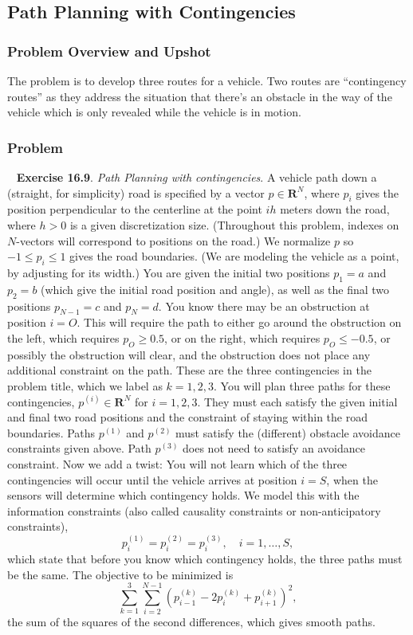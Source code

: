 \documentclass[12pt,reqno]{article}
\theoremstyle{definition}
\numberwithin{equation}{section}
\begin{document}
\newpage
\subsection{Path Planning with Contingencies}

\subsubsection*{Problem Overview and Upshot}

The problem is to develop three routes for a vehicle. Two routes are ``contingency routes''
as they address the situation that there's an obstacle in the way of the vehicle which is only
revealed while the vehicle is in motion.

\subsubsection*{Problem}
~\cite{EE364a-extra} \textbf{Exercise 16.9}. \textit{Path Planning with contingencies}.
A vehicle path down a (straight, for simplicity) road is specified
by a vector $p \in \mathbf{R}^N$, where $p_i$ gives the position perpendicular to the centerline at the point $i h$ meters down the road, where $h>0$ is a given discretization size. (Throughout this problem, indexes on $N$-vectors will correspond to positions on the road.)
We normalize $p$ so $-1 \leq p_i \leq 1$ gives the road boundaries. (We are modeling the vehicle as a point, by adjusting for its width.)
You are
given the initial two positions $p_1=a$ and $p_2=b$ (which give the initial road position and angle), as well as the final two positions $p_{N-1}=c$ and $p_N=d$.
You know there may be an obstruction at position $i=O$. This will require the path to either go around the obstruction on the left, which requires $p_O \geq 0.5$,
or on the right, which requires $p_O \leq-0.5$, or possibly the obstruction will clear, and the obstruction does not place any additional constraint on the path.
These are the three contingencies in the problem title, which we label as $k=1,2,3$.
You will plan three paths for these contingencies, $p^{(i)} \in \mathbf{R}^N$ for $i=1,2,3$.
They must each satisfy the given initial and final two road positions and the constraint of staying within the road boundaries.
Paths $p^{(1)}$ and $p^{(2)}$ must satisfy the (different) obstacle avoidance constraints given above. Path $p^{(3)}$ does not need to satisfy an avoidance constraint.
Now we add a twist: You will not learn which of the three contingencies will occur until the vehicle arrives at position $i=S$, when the sensors will determine which contingency holds.
We model this with the information constraints (also called causality constraints or non-anticipatory constraints),
\[
p_i^{(1)}=p_i^{(2)}=p_i^{(3)}, \quad i=1, \ldots, S,
\]
which state that before you know which contingency holds, the three paths must be the same.
The objective to be minimized is
\[
\sum_{k=1}^3 \sum_{i=2}^{N-1}\left(p_{i-1}^{(k)}-2 p_i^{(k)}+p_{i+1}^{(k)}\right)^2,
\]
the sum of the squares of the second differences, which gives smooth paths.
\end{document}

